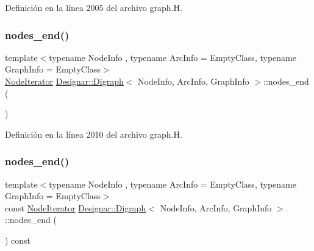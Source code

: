 Definición en la línea 2005 del archivo graph.\+H.

\mbox{\label{class_designar_1_1_digraph_a67917506d721e541955aa2a639b94759}} 
\subsubsection{\texorpdfstring{nodes\+\_\+end()}{nodes\_end()}\hspace{0.1cm}{\footnotesize\ttfamily [1/2]}}
{\footnotesize\ttfamily template$<$typename Node\+Info , typename Arc\+Info  = Empty\+Class, typename Graph\+Info  = Empty\+Class$>$ \\
\hyperlink{class_designar_1_1_digraph_1_1_node_iterator}{Node\+Iterator} \hyperlink{class_designar_1_1_digraph}{Designar\+::\+Digraph}$<$ Node\+Info, Arc\+Info, Graph\+Info $>$\+::nodes\+\_\+end (\begin{DoxyParamCaption}{ }\end{DoxyParamCaption})\hspace{0.3cm}{\ttfamily [inline]}}



Definición en la línea 2010 del archivo graph.\+H.

\mbox{\label{class_designar_1_1_digraph_a82c01284de2fc81c7bd04c13d8861d9a}} 
\subsubsection{\texorpdfstring{nodes\+\_\+end()}{nodes\_end()}\hspace{0.1cm}{\footnotesize\ttfamily [2/2]}}
{\footnotesize\ttfamily template$<$typename Node\+Info , typename Arc\+Info  = Empty\+Class, typename Graph\+Info  = Empty\+Class$>$ \\
const \hyperlink{class_designar_1_1_digraph_1_1_node_iterator}{Node\+Iterator} \hyperlink{class_designar_1_1_digraph}{Designar\+::\+Digraph}$<$ Node\+Info, Arc\+Info, Graph\+Info $>$\+::nodes\+\_\+end (\begin{DoxyParamCaption}{ }\end{DoxyParamCaption}) const\hspace{0.3cm}{\ttfamily [inline]}}




